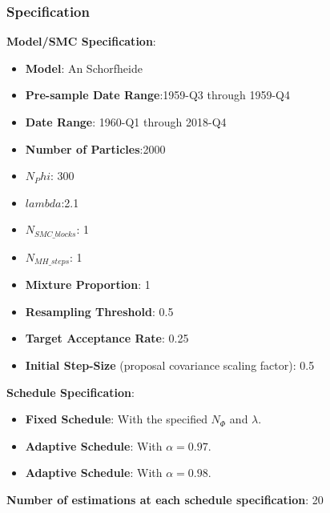 \documentclass{article}
\begin{document}
\subsubsection{Specification}
 \textbf{Model/SMC Specification}:\\
 \vspace{-.6cm}
 \begin{itemize}
 \item \textbf{Model}: An Schorfheide
 \item \textbf{Pre-sample Date Range}:1959-Q3 through 1959-Q4
 \item \textbf{Date Range}: 1960-Q1 through 2018-Q4
 \item \textbf{Number of Particles}:2000
 \item \textbf{$N_Phi$}: 300
 \item \textbf{$lambda$}:2.1
 \item \textbf{$N_{SMC\_blocks}$}: 1
 \item \textbf{$N_{MH\_steps}$}: 1
 \item \textbf{Mixture Proportion}: 1
 \item \textbf{Resampling Threshold}: 0.5
 \item \textbf{Target Acceptance Rate}: 0.25
 \item \textbf{Initial Step-Size} (proposal covariance scaling factor): 0.5
 \end{itemize}
 \hspace{-.65cm} \textbf{Schedule Specification}:\\
 \vspace{-.6cm}
 \begin{itemize}
 \item \textbf{Fixed Schedule}: With the specified $N_\Phi$ and $\lambda$.
 \item \textbf{Adaptive Schedule}: With $\alpha = 0.97$.
 \item \textbf{Adaptive Schedule}: With $\alpha = 0.98$.
 \end{itemize}
 \hspace{-.65cm}
 \textbf{Number of estimations at each schedule specification}: 20\\
\end{document}
